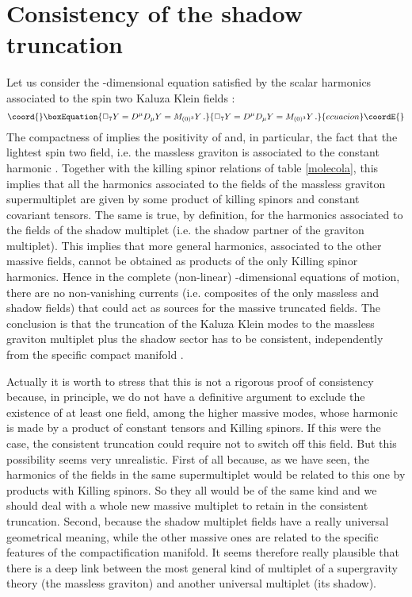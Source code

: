 \documentclass[a4paper,11pt]{article}
\begin{document}
\section{Consistency of the shadow truncation}
Let us consider the \coordHE{}-dimensional equation satisfied by the
scalar harmonics associated to the spin two Kaluza Klein fields
\coordHE{}:
\begin{equation}\coord{}\boxEquation{
  \Box_7 Y = D^\mu D_\mu Y = M_{(0)^3} Y\,.
}{
  \Box_7 Y = D^\mu D_\mu Y = M_{(0)^3} Y\,.
}{ecuacion}\coordE{}\end{equation}
The compactness of \coordHE{} implies the positivity of \coordHE{}
and, in particular, the fact that the lightest spin two field,
i.e. the massless graviton \coordHE{} is associated to the
constant harmonic \coordHE{}. Together with the killing spinor
relations of table \ref{molecola}, this implies that all the
harmonics associated to the fields of the massless graviton
supermultiplet are given by some product of killing spinors and
constant covariant tensors. The same is true, by definition, for
the harmonics associated to the fields of the shadow multiplet
(i.e. the shadow partner of the graviton multiplet). This implies
that more general harmonics, associated to the other massive
fields, cannot be obtained as products of the only Killing spinor
harmonics. Hence in the complete (non-linear) \coordHE{}-dimensional
equations of motion, there are no non-vanishing currents (i.e.
composites of the only massless and shadow fields) that could act
as sources for the massive truncated fields. The conclusion is
that the truncation of the Kaluza Klein modes to the massless
graviton multiplet plus the shadow sector has to be consistent,
independently from the specific compact manifold \coordHE{}.
\par
Actually it is worth to stress that this is not a rigorous proof
of consistency because, in principle, we do not have a definitive
argument to exclude the existence of at least one field, among the
higher massive modes, whose harmonic is made by a product of
constant tensors and Killing spinors. If this were the case, the
consistent truncation could require not to switch off this field.
But this possibility seems very unrealistic. First of all because,
as we have seen, the harmonics of the fields in the same
supermultiplet would be related to this one by products with
Killing spinors. So they all would be of the same kind and we
should deal with a whole new massive multiplet to retain in the
consistent truncation. Second, because the shadow multiplet fields
have a really universal geometrical meaning, while the other
massive ones are related to the specific features of the
compactification manifold. It seems therefore really plausible
that there is a deep link between the most general kind of
multiplet of a supergravity theory (the massless graviton) and
another universal multiplet (its shadow).
%
%
\end{document}
